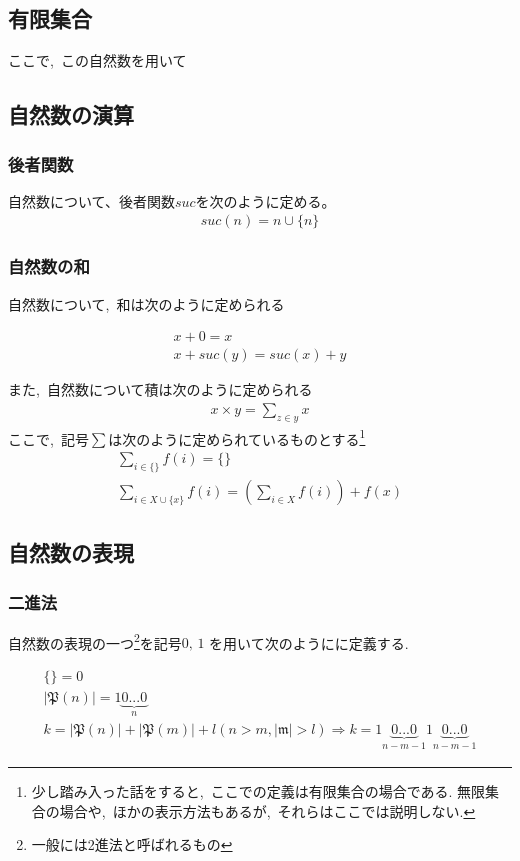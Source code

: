 \documentclass[hyperref,a4paper,12pt]{kininaruki}
\begin{document}
\subsection{有限集合}
ここで,\, この自然数を用いて
\subsection{自然数の演算}
\subsubsection{後者関数}
自然数について、後者関数$suc$を次のように定める。
\begin{align}
    suc(n) = n\cup\{n\}
\end{align}
\subsubsection{自然数の和}
自然数について,\, 和は次のように定められる

\begin{align}
    x + 0 = x\\
    x + suc(y) = suc(x) + y
\end{align}

また,\, 自然数について積は次のように定められる
\begin{align}
    x\times y = \sum_{z\in y} x
\end{align}
ここで,\, 記号$\sum$は次のように定められているものとする\footnote{少し踏み入った話をすると,\, %
ここでの定義は有限集合の場合である.%
無限集合の場合や,\, ほかの表示方法もあるが,\, それらはここでは説明しない.}
\begin{align}
    \sum_{i\in \{\}} f(i) = \{\}\\
    \sum_{i\in X\cup\{x\}} f(i) =\left(\sum_{i \in X} f(i)\right) + f(x)
\end{align}
\subsection{自然数の表現}
\subsubsection{二進法}
自然数の表現の一つ\footnote{一般には2進法と呼ばれるもの}を記号$0,\, 1$%
を用いて次のようにに定義する.
\begin{shadebox}
    \begin{align}
        \{\} = 0\\
        |\mathfrak{P}(n)| = 1{\underbrace{0...0}_{n}}\\
        k = |\mathfrak{P}(n)| + |\mathfrak{P}(m)| + l (n>m,|\mathfrak{m}|>l)%
        \Rightarrow k = 1{\underbrace{0...0}_{n-m-1}}1{\underbrace{0...0}_{n-m-1}}
    \end{align}
\end{shadebox}
\newpage
\end{document}
